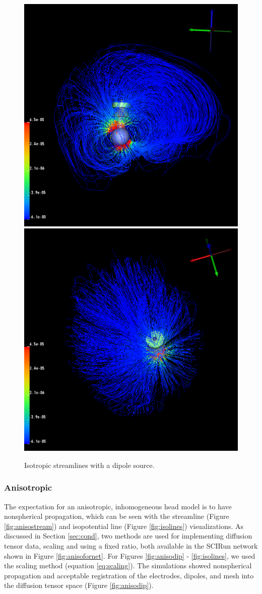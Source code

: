 \begin{figure}[H]
\begin{center}
\includegraphics[width=.49\textwidth]{Figures/iso_streamlines}
\includegraphics[width=.49\textwidth]{Figures/iso_streamlines_top}
\caption{Isotropic streamlines with a dipole source.}
\label{fig:isostream}
\end{center}
\end{figure}

\subsubsection{Anisotropic}

The expectation for an anisotropic, inhomogeneous head model is to have nonspherical propagation, which can be seen with the streamline (Figure \ref{fig:anisostream}) and isopotential line (Figure \ref{fig:isolines}) visualizations. As discussed in Section \ref{sec:cond}, two methods are used for implementing diffusion tensor data, scaling and using a fixed ratio, both available in the SCIRun network shown in Figure \ref{fig:anisofornet}. For Figures \ref{fig:anisodip} - \ref{fig:isolines}, we used the scaling method (equation \ref{eq:scaling}). The simulations showed nonspherical propagation and acceptable registration of the electrodes, dipoles, and mesh into the diffusion tensor space (Figure \ref{fig:anisodip}).

